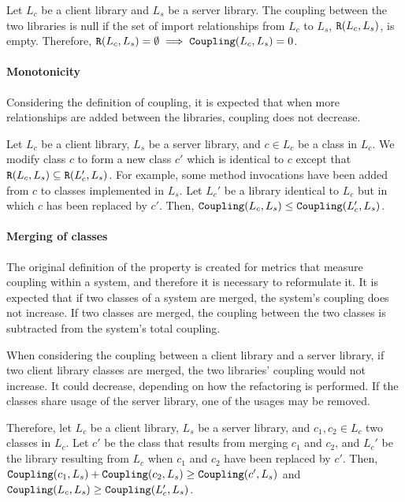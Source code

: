 Let $L_c$ be a client library and $L_s$ be a server library. The coupling between the two libraries is null if the set of import relationships from $L_c$ to $L_s$, $\verb|R|(L_c, L_s)$, is empty. Therefore, $\verb|R|(L_c, L_s) = \emptyset \implies \verb|Coupling|(L_c, L_s) = 0$.

\paragraph{Monotonicity}
Considering the definition of coupling, it is expected that when more relationships are added between the libraries, coupling does not decrease.

Let $L_c$ be a client library, $L_s$ be a server library, and $c \in L_c$ be a class in $L_c$. We modify class $c$ to form a new class $c'$ which is identical to $c$ except that $\verb|R|(L_c, L_s) \subseteq \verb|R|(L_c', L_s)$. For example, some method invocations have been added from $c$ to classes implemented in $L_s$. Let $L_c'$ be a library identical to $L_c$ but in which $c$ has been replaced by $c'$. Then, $\verb|Coupling|(L_c, L_s) \le \verb|Coupling|(L_c', L_s)$.

\paragraph{Merging of classes}
The original definition of the property is created for metrics that measure coupling within a system, and therefore it is necessary to reformulate it. It is expected that if two classes of a system are merged, the system's coupling does not increase. If two classes are merged, the coupling between the two classes is subtracted from the system's total coupling.

When considering the coupling between a client library and a server library, if two client library classes are merged, the two libraries' coupling would not increase. It could decrease, depending on how the refactoring is performed. If the classes share usage of the server library, one of the usages may be removed.

Therefore, let $L_c$ be a client library, $L_s$ be a server library, and $c_1, c_2 \in L_c$ two classes in $L_c$. Let $c'$ be the class that results from merging  $c_1$ and $c_2$, and $L_c'$ be the library resulting from $L_c$ when $c_1$ and $c_2$ have been replaced by $c'$. Then, $\verb|Coupling|(c_1, L_s) + \verb|Coupling|(c_2, L_s) \ge \verb|Coupling|(c', L_s)$ and $\verb|Coupling|(L_c, L_s) \ge \verb|Coupling|(L_c', L_s)$.


